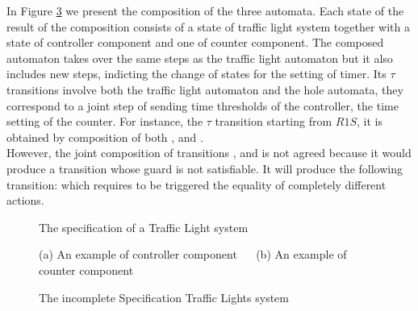 \documentclass[runningheads]{llncs}
\begin{document}
In Figure \ref{fig:tlf} we present the composition of the three automata. Each state of the result of the composition consists  of  a state of traffic light system together with a state of controller component and one of counter component. The composed automaton  takes over  the same steps as the traffic light automaton but it also includes new steps,  indicting the change of states for the setting of timer. Its $\tau$ transitions involve both the traffic light automaton and the hole  automata, they correspond to  a joint step of  sending time thresholds of the controller, the time setting of the counter. For instance, the  $\tau$  transition starting from \(R1S\), it is obtained by composition of both 
,  and   . \\ 
However, the joint composition of transitions  ,  and 
 is not agreed because it would produce a transition whose guard is not satisfiable. It will produce the following transition:  which requires to be triggered  the equality of completely different actions. 








\begin{figure}[!tb]
\centering
\scalebox{.75}{}
\caption{The specification of a Traffic Light system}
\label{fig:tls}
\end{figure}


\begin{figure}[!tb]
\scalebox{.75}{}
\scalebox{.75}{}
\caption{(a) An example of controller component ~~  (b) An example of counter component}
\label{fig:ctlandcnt}
\end{figure}

\begin{figure}[!tb]
\centering
\scalebox{.75}{}
\caption{The incomplete Specification Traffic Lights system}
\label{fig:tlf}
\end{figure}
\end{document}
